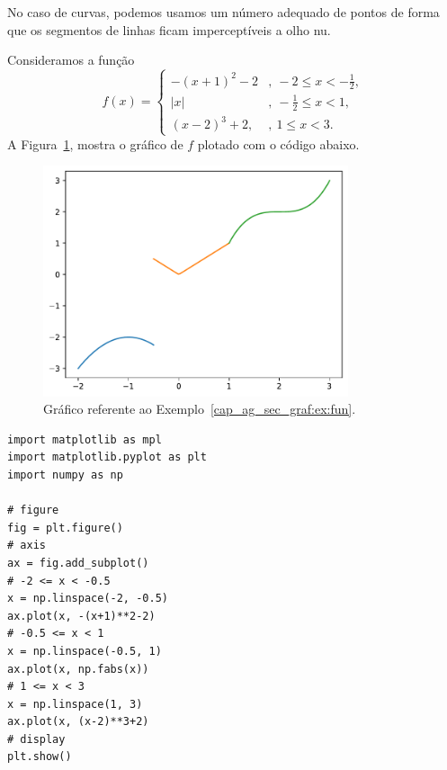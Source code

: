 No caso de curvas, podemos usamos um número adequado de pontos de forma que os segmentos de linhas ficam imperceptíveis a olho nu.

\begin{ex}\label{cap_ag_sec_graf:ex:fun}
  Consideramos a função
  \begin{equation}
    f(x) = \left\{
      \begin{array}{ll}
        -(x+1)^2-2 &, ~-2\leq x < -\frac{1}{2},\\
        |x| &, ~-\frac{1}{2}\leq x < 1,\\
        (x-2)^3 + 2, &, ~1\leq x < 3.
      \end{array}
    \right.
  \end{equation}
  A Figura~\ref{cap_ag_sec_graf:fig:fun}, mostra o gráfico de $f$ plotado com o código abaixo.

  \begin{figure}[H]
    \centering
    \includegraphics[width=0.8\textwidth]{./cap_ag/dados/fig_fun/fig}
    \caption{Gráfico referente ao Exemplo~\ref{cap_ag_sec_graf:ex:fun}.}
    \label{cap_ag_sec_graf:fig:fun}
  \end{figure}  

\begin{lstlisting}
import matplotlib as mpl
import matplotlib.pyplot as plt
import numpy as np

# figure
fig = plt.figure()
# axis
ax = fig.add_subplot()
# -2 <= x < -0.5
x = np.linspace(-2, -0.5)
ax.plot(x, -(x+1)**2-2)
# -0.5 <= x < 1
x = np.linspace(-0.5, 1)
ax.plot(x, np.fabs(x))
# 1 <= x < 3
x = np.linspace(1, 3)
ax.plot(x, (x-2)**3+2)
# display
plt.show()
\end{lstlisting}

\end{ex}

